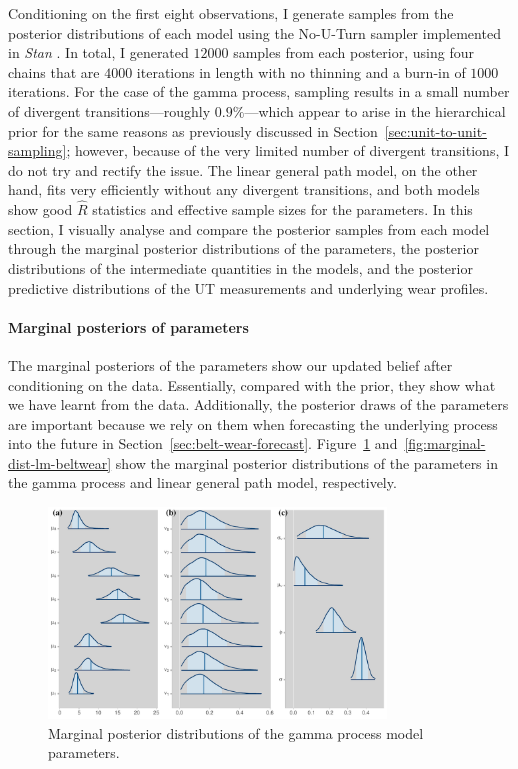 Conditioning on the first eight observations, I generate samples from the posterior distributions of each model using the No-U-Turn sampler implemented in \textit{Stan} \citep{Stan2022}. In total, I generated $12000$ samples from each posterior, using four chains that are $4000$ iterations in length with no thinning and a burn-in of $1000$ iterations. For the case of the gamma process, sampling results in a small number of divergent transitions---roughly $0.9\%$---which appear to arise in the hierarchical prior for the same reasons as previously discussed in Section~\ref{sec:unit-to-unit-sampling}; however, because of the very limited number of divergent transitions, I do not try and rectify the issue. The linear general path model, on the other hand, fits very efficiently without any divergent transitions, and both models show good $\hat{R}$ statistics and effective sample sizes for the parameters. In this section, I visually analyse and compare the posterior samples from each model through the marginal posterior distributions of the parameters, the posterior distributions of the intermediate quantities in the models, and the posterior predictive distributions of the UT measurements and underlying wear profiles.

\paragraph{Marginal posteriors of parameters} 
The marginal posteriors of the parameters show our updated belief after conditioning on the data. Essentially, compared with the prior, they show what we have learnt from the data. Additionally, the posterior draws of the parameters are important because we rely on them when forecasting the underlying process into the future in Section~\ref{sec:belt-wear-forecast}. Figure~\ref{fig:marginal-dist-gp-beltwear} and~\ref{fig:marginal-dist-lm-beltwear} show the marginal posterior distributions of the parameters in the gamma process and linear general path model, respectively.

\begin{figure}
  \centering
  \includegraphics[width=0.8\textwidth]{figures/ch-6/marginal_post_gp.pdf}
  \caption{Marginal posterior distributions of the gamma process model parameters.}
  \label{fig:marginal-dist-gp-beltwear}
\end{figure}

